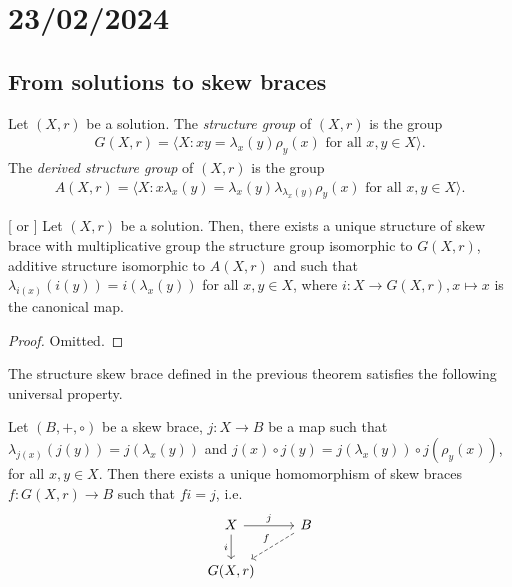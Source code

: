 \section{23/02/2024}

\subsection{From solutions to skew braces}

    \begin{definition}
        Let $(X,r)$ be a solution. The \emph{structure group} of $(X,r)$ is the group
        \begin{align*}
            G(X,r)=\langle X : xy=\lambda_x(y)\rho_y(x) \text{ for all }x,y\in X\rangle.
        \end{align*}
        The \emph{derived structure group} of $(X,r)$ is the group
        \begin{align*} 
            A(X,r)=\langle X : x\lambda_x(y)=\lambda_x(y)\lambda_{\lambda_x(y)}\rho_y(x) \text{ for all }x,y\in X\rangle.
        \end{align*}
    \end{definition}

        
    \begin{theorem}\label{thm:structuregroup}[\cite{MR1722951} or \cite{LYZ00}]
    Let $(X,r)$ be a solution.
    Then, there exists a unique structure of skew brace with multiplicative group the structure group isomorphic to $G(X,r)$, additive structure isomorphic to $A(X,r)$ and such that $\lambda_{i(x)}(i(y))=i(\lambda_x(y))$ for all $x,y\in X$, where $i: X\to G(X,r), x\mapsto x$ is the canonical map. 
    \end{theorem}

    \begin{proof}
        Omitted.
    \end{proof}

    The structure skew brace defined in the previous theorem satisfies the following universal property.
    
    \begin{proposition}
        Let $(B,+,\circ)$ be a skew brace, $j\colon X\rightarrow B$ be a map such that $\lambda_{j(x)}(j(y))=j(\lambda_x(y))$ and $j(x)\circ j(y)=j(\lambda_x(y))\circ j(\rho_y(x))$, for all $x,y\in X$. Then there exists a unique homomorphism of skew braces $f\colon G(X,r)\rightarrow B$ such that $fi=j$, i.e.
        \begin{equation*}
        \begin{tikzcd}
            X \arrow[r,"j"] \arrow[d,swap,"i"] &
            B \arrow[dl,swap, dashed,"f"] 
            \\
            G(X,r) 
        \end{tikzcd}
        \end{equation*}
    \end{proposition}

